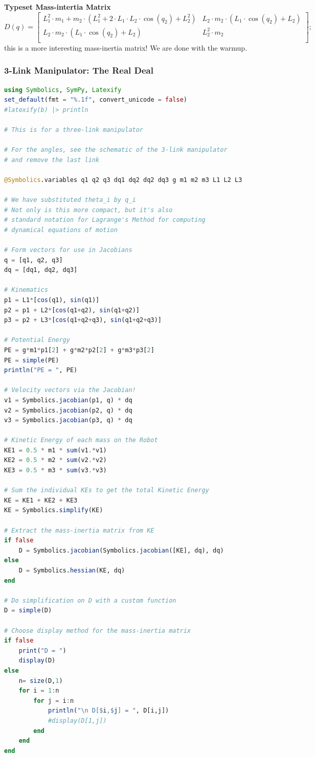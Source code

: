 \textbf{Typeset Mass-intertia Matrix}
\begin{equation} D(q) =\left[\begin{array}{cc}L_{1}^{2} \cdot m_{1} + m_{2} \cdot \left( L_{1}^{2} + 2 \cdot L_{1} \cdot L_{2} \cdot \cos\left( q_{2} \right) + L_{2}^{2} \right) & L_{2} \cdot m_{2} \cdot \left( L_{1} \cdot \cos\left( q_{2} \right) + L_{2} \right) \\L_{2} \cdot m_{2} \cdot \left( L_{1} \cdot \cos\left( q_{2} \right) + L_{2} \right) & L_{2}^{2} \cdot m_{2} \\\end{array}\right];\end{equation}
this is a more interesting mass-inertia matrix! We are done with the warmup.

\subsubsection{3-Link Manipulator: The Real Deal}
\begin{lstlisting}[language=Julia,style=mystyle]
using Symbolics, SymPy, Latexify
set_default(fmt = "%.1f", convert_unicode = false)
#latexify(b) |> println

# This is for a three-link manipulator

# For the angles, see the schematic of the 3-link manipulator
# and remove the last link

@Symbolics.variables q1 q2 q3 dq1 dq2 dq2 dq3 g m1 m2 m3 L1 L2 L3

# We have substituted theta_i by q_i
# Not only is this more compact, but it's also
# standard notation for Lagrange's Method for computing
# dynamical equations of motion

# Form vectors for use in Jacobians
q = [q1, q2, q3]
dq = [dq1, dq2, dq3]

# Kinematics
p1 = L1*[cos(q1), sin(q1)]
p2 = p1 + L2*[cos(q1+q2), sin(q1+q2)]
p3 = p2 + L3*[cos(q1+q2+q3), sin(q1+q2+q3)]

# Potential Energy
PE = g*m1*p1[2] + g*m2*p2[2] + g*m3*p3[2]
PE = simple(PE)
println("PE = ", PE)

# Velocity vectors via the Jacobian!
v1 = Symbolics.jacobian(p1, q) * dq
v2 = Symbolics.jacobian(p2, q) * dq
v3 = Symbolics.jacobian(p3, q) * dq

# Kinetic Energy of each mass on the Robot
KE1 = 0.5 * m1 * sum(v1.*v1) 
KE2 = 0.5 * m2 * sum(v2.*v2)
KE3 = 0.5 * m3 * sum(v3.*v3)

# Sum the individual KEs to get the total Kinetic Energy
KE = KE1 + KE2 + KE3
KE = Symbolics.simplify(KE)

# Extract the mass-inertia matrix from KE
if false
    D = Symbolics.jacobian(Symbolics.jacobian([KE], dq), dq)
else
    D = Symbolics.hessian(KE, dq)
end

# Do simplification on D with a custom function 
D = simple(D)

# Choose display method for the mass-inertia matrix
if false
    print("D = ")
    display(D)
else
    n= size(D,1)
    for i = 1:n
        for j = i:n
            println("\n D[$i,$j] = ", D[i,j])
            #display(D[1,j])
        end
    end
end
\end{lstlisting}
